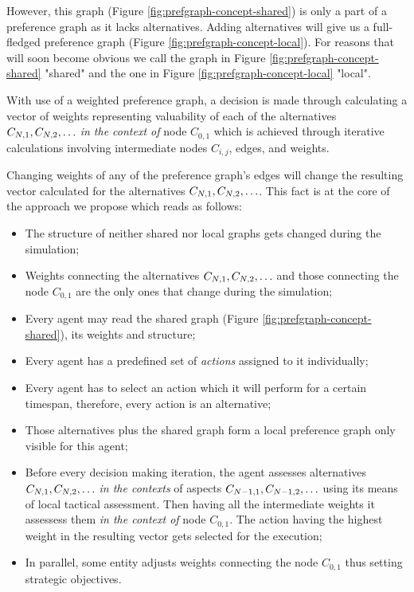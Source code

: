 However, this graph (Figure \ref{fig:prefgraph-concept-shared}) is only a part of a preference graph as it lacks
alternatives. Adding alternatives will give us a full-fledged preference graph (Figure
\ref{fig:prefgraph-concept-local}). For reasons that will soon become obvious we call the graph in Figure
\ref{fig:prefgraph-concept-shared} "shared" and the one in Figure \ref{fig:prefgraph-concept-local} "local".

With use of a weighted preference graph, a decision is made through calculating a vector of weights representing
valuability of each of the alternatives $C_{N,1}, C_{N,2},\ldots$ \textit{in the context of} node $C_{0,1}$ which is
achieved through iterative calculations involving intermediate nodes $C_{i,j}$, edges, and weights.

Changing weights of any of the preference graph's edges will change the resulting vector calculated for the alternatives
$C_{N,1}, C_{N,2},\ldots$. This fact is at the core of the approach we propose which reads as follows:

\begin{itemize}
    \item The structure of neither shared nor local graphs gets changed during the simulation;
    \item Weights connecting the alternatives $C_{N,1}, C_{N,2},\ldots$ and those connecting the node $C_{0,1}$ are the only ones that
        change during the simulation;
    \item Every agent may read the shared graph (Figure \ref{fig:prefgraph-concept-shared}), its weights and structure;
    \item Every agent has a predefined set of \textit{actions} assigned to it individually;
    \item Every agent has to select an action which it will perform for a certain timespan, therefore, every action is
        an alternative;
    \item Those alternatives plus the shared graph form a local preference graph only visible for this agent;
    \item Before every decision making iteration, the agent assesses alternatives $C_{N,1}, C_{N,2},\ldots$ \textit{in the contexts} of
        aspects $ C_{N-1,1}, C_{N-1,2}, \ldots $ using its means of local tactical assessment. Then having all the intermediate weights
        it assessess them \textit{in the context of} node $C_{0,1}$. The action having the highest weight in the
        resulting vector gets selected for the execution;
    \item In parallel, some entity adjusts weights connecting the node $C_{0,1}$ thus setting strategic objectives.
\end{itemize}

